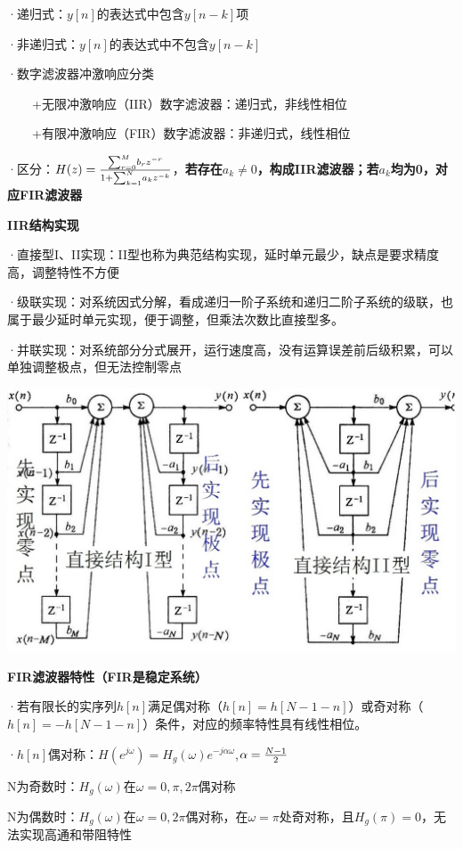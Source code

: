 ·递归式：$y[n]$的表达式中包含$y[n-k]$项

·非递归式：$y[n]$的表达式中不包含$y[n-k]$

·数字滤波器冲激响应分类

~~~~+无限冲激响应（IIR）数字滤波器：递归式，非线性相位

~~~~+有限冲激响应（FIR）数字滤波器：非递归式，线性相位

·区分：$H(z)={{{\sum_{r=0}^M}b_rz^{-r}}\over{1+{\sum_{k=1}^N}a_kz^{-k}}}$，\textbf{若存在$a_k≠0$，构成IIR滤波器；若$a_k$均为0，对应FIR滤波器}

\textbf{IIR结构实现}

·直接型I、II实现：II型也称为典范结构实现，延时单元最少，缺点是要求精度高，调整特性不方便

·级联实现：对系统因式分解，看成递归一阶子系统和递归二阶子系统的级联，也属于最少延时单元实现，便于调整，但乘法次数比直接型多。

·并联实现：对系统部分分式展开，运行速度高，没有运算误差前后级积累，可以单独调整极点，但无法控制零点
\begin{figurehere}
	\centering
	\includegraphics[width=1\linewidth]{image04}
	\label{fig:image04}
\end{figurehere}
\textbf{FIR滤波器特性（FIR是稳定系统）}

·若有限长的实序列$h[n]$满足偶对称（$h[n]=h[N-1-n]$）或奇对称（$h[n]=-h[N-1-n]$）条件，对应的频率特性具有线性相位。

·$h[n]$偶对称：$H(e^{j\omega})=H_g(\omega)e^{-j\alpha\omega}$,$\alpha={{N-1}\over{2}}$
   
   N为奇数时：$H_g(\omega)$在$\omega=0,\pi,2\pi$偶对称
   
   N为偶数时：$H_g(\omega)$在$\omega=0,2\pi$偶对称，在$\omega=\pi$处奇对称，且$H_g(\pi)=0$，无法实现高通和带阻特性

